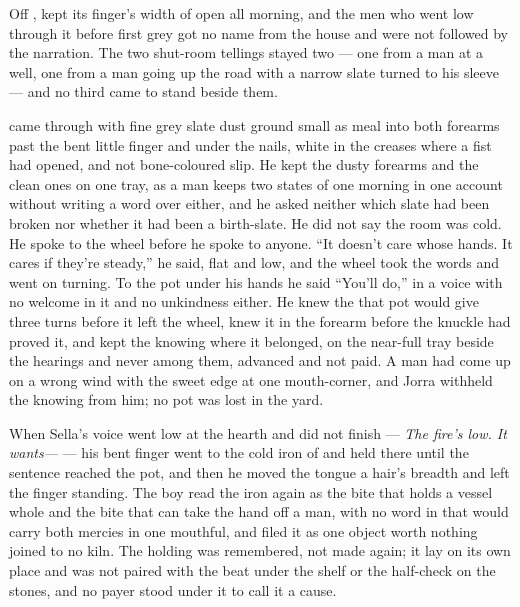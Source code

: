 \scenebreak

Off ,  kept its finger's width of open all morning, and the men who went low through it before first grey got no name from the house and were not followed by the narration. The two shut-room tellings stayed two --- one from a man at a well, one from a man going up the road with a narrow slate turned to his sleeve --- and no third came to stand beside them.

 came through with fine grey slate dust ground small as meal into both forearms past the bent little finger and under the nails, white in the creases where a fist had opened, and not bone-coloured slip. He kept the dusty forearms and the clean ones on one tray, as a man keeps two states of one morning in one account without writing a word over either, and he asked neither which slate had been broken nor whether it had been a birth-slate. He did not say the room was cold. He spoke to the wheel before he spoke to anyone. “It doesn't care whose hands. It cares if they're steady,” he said, flat and low, and the wheel took the words and went on turning. To the pot under his hands he said “You'll do,” in a voice with no welcome in it and no unkindness either. He knew the  that pot would give three turns before it left the wheel, knew it in the forearm before the knuckle had proved it, and kept the knowing where it belonged, on the near-full tray beside the hearings and never among them, advanced and not paid. A man had come up on a wrong wind with the sweet edge at one mouth-corner, and Jorra withheld the knowing from him; no pot was lost in the yard.

When Sella's voice went low at the hearth and did not finish --- \emph{The fire's low. It wants---} --- his bent finger went to the cold iron of  and held there until the sentence reached the pot, and then he moved the tongue a hair's breadth and left the finger standing. The boy read the iron again as the bite that holds a vessel whole and the bite that can take the hand off a man, with no word in  that would carry both mercies in one mouthful, and filed it as one object worth nothing joined to no kiln. The holding was remembered, not made again; it lay on its own place and was not paired with the beat under the shelf or the half-check on the stones, and no payer stood under it to call it a cause.

